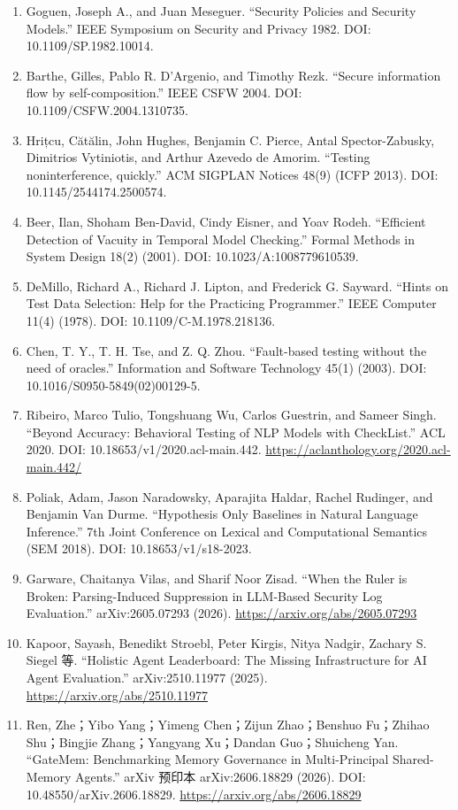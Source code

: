 \documentclass[UTF8,11pt]{ctexart}
\begin{document}
\begin{enumerate}[leftmargin=*,nosep]
\item Goguen, Joseph A., and Juan Meseguer. ``Security Policies and Security Models.'' IEEE Symposium on Security and Privacy 1982. DOI: 10.1109/SP.1982.10014.
\item Barthe, Gilles, Pablo R. D'Argenio, and Timothy Rezk. ``Secure information flow by self-composition.'' IEEE CSFW 2004. DOI: 10.1109/CSFW.2004.1310735.
\item Hrițcu, Cătălin, John Hughes, Benjamin C. Pierce, Antal Spector-Zabusky, Dimitrios Vytiniotis, and Arthur Azevedo de Amorim. ``Testing noninterference, quickly.'' ACM SIGPLAN Notices 48(9) (ICFP 2013). DOI: 10.1145/2544174.2500574.
\item Beer, Ilan, Shoham Ben-David, Cindy Eisner, and Yoav Rodeh. ``Efficient Detection of Vacuity in Temporal Model Checking.'' Formal Methods in System Design 18(2) (2001). DOI: 10.1023/A:1008779610539.
\item DeMillo, Richard A., Richard J. Lipton, and Frederick G. Sayward. ``Hints on Test Data Selection: Help for the Practicing Programmer.'' IEEE Computer 11(4) (1978). DOI: 10.1109/C-M.1978.218136.
\item Chen, T. Y., T. H. Tse, and Z. Q. Zhou. ``Fault-based testing without the need of oracles.'' Information and Software Technology 45(1) (2003). DOI: 10.1016/S0950-5849(02)00129-5.
\item Ribeiro, Marco Tulio, Tongshuang Wu, Carlos Guestrin, and Sameer Singh. ``Beyond Accuracy: Behavioral Testing of NLP Models with CheckList.'' ACL 2020. DOI: 10.18653/v1/2020.acl-main.442. \url{https://aclanthology.org/2020.acl-main.442/}
\item Poliak, Adam, Jason Naradowsky, Aparajita Haldar, Rachel Rudinger, and Benjamin Van Durme. ``Hypothesis Only Baselines in Natural Language Inference.'' 7th Joint Conference on Lexical and Computational Semantics (SEM 2018). DOI: 10.18653/v1/s18-2023.
\item Garware, Chaitanya Vilas, and Sharif Noor Zisad. ``When the Ruler is Broken: Parsing-Induced Suppression in LLM-Based Security Log Evaluation.'' arXiv:2605.07293 (2026). \url{https://arxiv.org/abs/2605.07293}
\item Kapoor, Sayash, Benedikt Stroebl, Peter Kirgis, Nitya Nadgir, Zachary S. Siegel 等. ``Holistic Agent Leaderboard: The Missing Infrastructure for AI Agent Evaluation.'' arXiv:2510.11977 (2025). \url{https://arxiv.org/abs/2510.11977}
\item Ren, Zhe；Yibo Yang；Yimeng Chen；Zijun Zhao；Benshuo Fu；Zhihao Shu；Bingjie Zhang；Yangyang Xu；Dandan Guo；Shuicheng Yan. ``GateMem: Benchmarking Memory Governance in Multi-Principal Shared-Memory Agents.'' arXiv 预印本 arXiv:2606.18829 (2026). DOI: 10.48550/arXiv.2606.18829. \url{https://arxiv.org/abs/2606.18829}

\end{enumerate}
\end{document}
